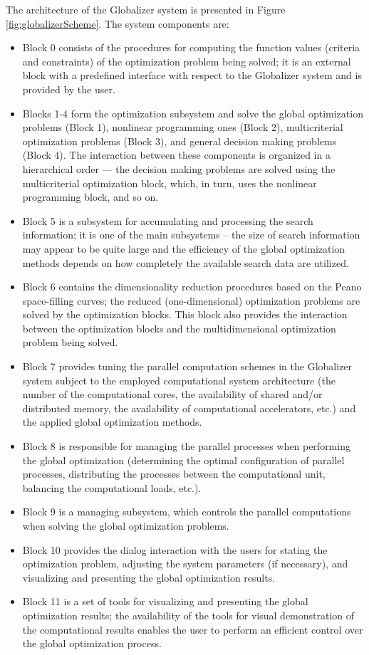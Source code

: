 \documentclass{aims}
\theoremstyle{definition}
\begin{document}
\par
The architecture of the Globalizer system is presented in Figure \ref{fig:globalizerScheme}.
The system components are:
\begin{itemize}
  \item Block 0 consists of the procedures for computing the function values
  (criteria and constraints) of the optimization problem being solved; it is an external
  block with a predefined interface with respect to the Globalizer system and is provided by the user.
  \item Blocks 1-4 form the optimization subsystem and solve the global optimization
  problems (Block 1), nonlinear programming ones (Block 2), multicriterial optimization problems
  (Block 3), and general decision making problems (Block 4). The interaction between these
  components is organized in a hierarchical order --- the decision making problems are
  solved using the multicriterial optimization block, which, in turn, uses the nonlinear programming block, and so on.
  \item Block 5 is a subsystem for accumulating and processing the search information; it is one of the main subsystems – the size of search information may appear to be quite large and the efficiency of the global optimization methods depends on how completely the available search data are utilized.
  \item Block 6 contains the dimensionality reduction procedures based on the Peano space-filling curves; the reduced (one-dimensional) optimization problems are solved by the optimization blocks. This block also provides the interaction between the optimization blocks and the multidimensional optimization problem being solved.
  \item Block 7 provides tuning the parallel computation schemes in the Globalizer system subject to the employed computational system architecture (the number of the computational cores, the availability of shared and/or distributed memory, the availability of computational accelerators, etc.) and the applied global optimization methods.
  \item Block 8 is responsible for managing the parallel processes when performing the global optimization (determining the optimal configuration of parallel processes, distributing the processes between the computational unit, balancing the computational loads, etc.).
  \item Block 9 is a managing subsystem, which controls the parallel computations when solving the global optimization problems.
  \item Block 10 provides the dialog interaction with the users for stating the optimization problem, adjusting the system parameters (if necessary), and visualizing and presenting the global optimization results.
  \item Block 11 is a set of tools for visualizing and presenting the global optimization results; the availability of the tools for visual demonstration of the computational results enables the user to perform an efficient control over the global optimization process.
\end{itemize}
\end{document}
